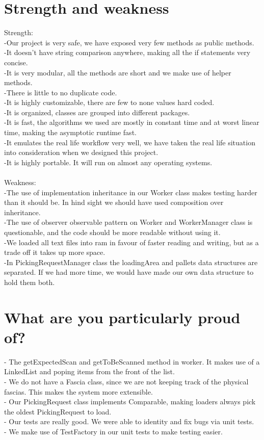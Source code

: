 \documentclass[12pt]{article}
\begin{document}
\section*{Strength and weakness}
Strength:\\
-Our project is very safe, we have exposed very few methods as public methods.\\
-It doesn't have string comparison anywhere, making all the if statements very \\concise.\\
-It is very modular, all the methods are short and we make use of helper methods.\\
-There is little to no duplicate code.\\
-It is highly customizable, there are few to none values hard coded.\\
-It is organized, classes are grouped into different packages.\\
-It is fast, the algorithms we used are mostly in constant time and at worst linear time, making the asymptotic runtime fast.\\ 
-It emulates the real life workflow very well, we have taken the real life situation into consideration when we designed this project.\\
-It is highly portable. It will run on almost any operating systems. \\
\hfill\\
Weakness:\\
-The use of implementation inheritance in our Worker class makes testing harder than it should be. In hind sight we should have used composition over inheritance.\\
-The use of observer observable pattern on Worker and WorkerManager class is questionable, and the code should be more readable without using it.\\
-We loaded all text files into ram in favour of faster reading and writing, but as a trade off it takes up more space.\\
-In PickingRequestManager class the loadingArea and pallets data structures are separated. If we had more time, we would have made our own data structure to hold them both.\\
\pagebreak
\section*{What are you particularly proud of?}
- The getExpectedScan and getToBeScanned method in worker. It makes use of a LinkedList and poping items from the front of the list.\\
- We do not have a Fascia class, since we are not keeping track of the physical fascias. This makes the system more extensible.\\
- Our PickingRequest class implements Comparable, making loaders always pick the oldest PickingRequest to load.\\
- Our tests are really good. We were able to identity and fix bugs via unit tests.\\
- We make use of TestFactory in our unit tests to make testing easier.
\pagebreak
\end{document}
